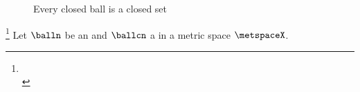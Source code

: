 \begin{figure}[th]
  \center
  
  \caption[Every closed ball is a closed set]{
    Every closed ball is a closed set 
    \label{fig:ms_closedball_closedset}
    }
\end{figure}
\begin{proposition}
\label{prop:oball_open}
\label{prop:cball_closed}
\footnote{
  \\
  }
Let $\balln$ be an  and $\ballcn$ a  
in a metric space $\metspaceX$.
\end{proposition}
